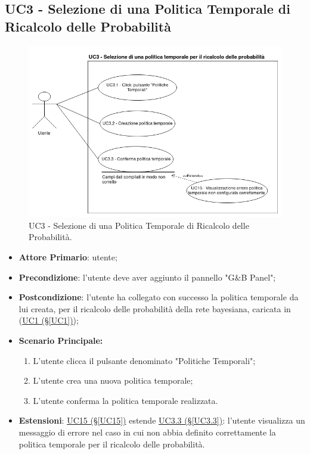\subsection{UC3 - Selezione di una Politica Temporale di Ricalcolo delle Probabilità}\label{UC3}

\begin{figure}[H]
\centering
\includegraphics[scale=0.5]{./images/UC3.png}
\caption{UC3 - Selezione di una Politica Temporale di Ricalcolo delle Probabilità.}
\end{figure}

\begin{itemize}
	\item \textbf{Attore Primario}: utente; 
	\item \textbf{Precondizione}: l'utente deve aver aggiunto il pannello "G\&B Panel";
	\item \textbf{Postcondizione}: l'utente ha collegato con successo la politica temporale da lui creata, per il ricalcolo delle probabilità della rete bayesiana, caricata in (\hyperref[UC1]{UC1 (§\ref*{UC1})});	
	\item \textbf{Scenario Principale:}
	\begin{enumerate}
		\item L'utente clicca il pulsante denominato "Politiche Temporali";
		\item L'utente crea una nuova politica temporale; 
		\item L'utente conferma la politica temporale realizzata.
	\end{enumerate}
	\item \textbf{Estensioni}: \hyperref[UC15]{UC15 (§\ref*{UC15})} estende \hyperref[UC3.3]{UC3.3 (§\ref*{UC3.3})}: l'utente visualizza un messaggio di errore nel caso in cui non abbia definito correttamente la politica temporale per il ricalcolo delle probabilità.
	
\end{itemize}

